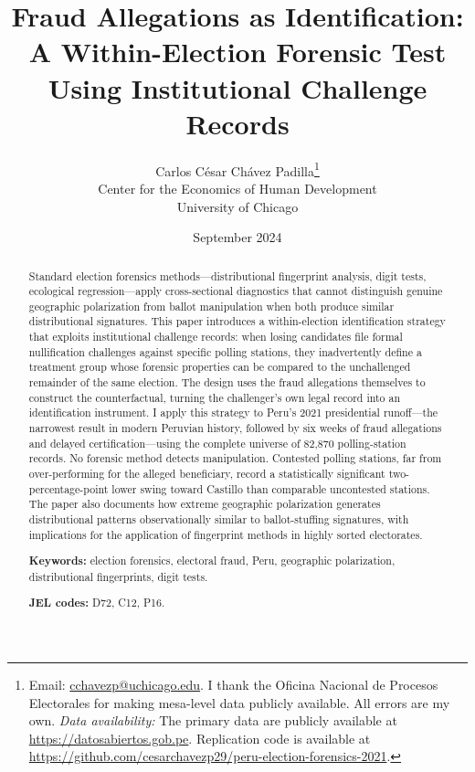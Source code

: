 \documentclass[12pt]{article}
\title{Fraud Allegations as Identification:\\
       A Within-Election Forensic Test Using Institutional Challenge Records}
\author{Carlos C\'esar Ch\'avez Padilla\thanks{%
  Email: \href{mailto:cchavezp@uchicago.edu}{cchavezp@uchicago.edu}.
  I thank the Oficina Nacional de Procesos Electorales for making
  mesa-level data publicly available. All errors are my own.
  \textit{Data availability:} The primary data are publicly available
  at \url{https://datosabiertos.gob.pe}. Replication code is available
  at \url{https://github.com/cesarchavezp29/peru-election-forensics-2021}.}\\[4pt]
  \normalsize Center for the Economics of Human Development\\
  \normalsize University of Chicago}
\date{September 2024}
\begin{document}
\maketitle
\thispagestyle{empty}

\begin{abstract}
\noindent
\begin{onehalfspacing}
\small
Standard election forensics methods---distributional fingerprint analysis,
digit tests, ecological regression---apply cross-sectional diagnostics that
cannot distinguish genuine geographic polarization from ballot manipulation
when both produce similar distributional signatures. This paper introduces a
within-election identification strategy that exploits institutional challenge
records: when losing candidates file formal nullification challenges against
specific polling stations, they inadvertently define a treatment group whose
forensic properties can be compared to the unchallenged remainder of the same
election. The design uses the fraud allegations themselves to construct the
counterfactual, turning the challenger's own legal record into an
identification instrument. I apply this strategy to Peru's 2021 presidential
runoff---the narrowest result in modern Peruvian history, followed by six
weeks of fraud allegations and delayed certification---using the complete
universe of 82{,}870 polling-station records. No forensic method detects
manipulation. Contested polling stations, far from over-performing for the
alleged beneficiary, record a statistically significant two-percentage-point
lower swing toward Castillo than comparable uncontested stations. The paper
also documents how extreme geographic polarization generates distributional
patterns observationally similar to ballot-stuffing signatures, with
implications for the application of fingerprint methods in highly sorted
electorates.
\end{onehalfspacing}

\medskip
\noindent\textbf{Keywords:} election forensics, electoral fraud, Peru,
geographic polarization, distributional fingerprints, digit tests.

\medskip
\noindent\textbf{JEL codes:} D72, C12, P16.
\end{abstract}

\thispagestyle{empty}
\end{document}
